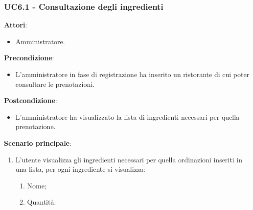 \subsubsection{UC6.1 - Consultazione degli ingredienti}\label{usecase:6_1}
\textbf{Attori}:
\begin{itemize}
    \item Amministratore.
\end{itemize}
\textbf{Precondizione}:
\begin{itemize}
    \item L'amministratore in fase di registrazione ha inserito un ristorante di cui poter consultare le prenotazioni.
\end{itemize}
\textbf{Postcondizione}:
\begin{itemize}
    \item L'amministratore ha visualizzato la lista di ingredienti necessari per quella prenotazione.
\end{itemize}
\textbf{Scenario principale}:
\begin{enumerate}
    \item L'utente visualizza gli ingredienti necessari per quella ordinazioni inseriti in una lista, per ogni ingrediente si visualizza:
    \begin{enumerate}
        \item Nome;
        \item Quantità.
    \end{enumerate}
\end{enumerate}